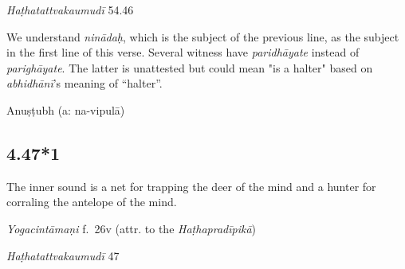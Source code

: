 \begin{ekdosis}

\begin{testimonia}[hp04_047]
\emph{Haṭhatattvakaumudī} 54.46
\begin{versinnote}
\end{versinnote}
\end{testimonia}

\begin{philcomm}[hp04_047]
We understand \textit{ninādaḥ}, which is the subject of the previous line, as the subject in the first line of this verse. Several witness have \emph{paridhāyate} instead of \emph{parighāyate}. The latter is unattested but could mean "is a halter" based on \emph{abhidhānī}’s meaning of “halter”.
\end{philcomm}

\begin{metre}[hp04_047]
Anuṣṭubh (a: na-vipulā)
\end{metre}

\subsection*{4.47*1}
\begin{translation}[hp04_047_1]
The inner sound is a net for trapping the deer of the mind and a hunter for corraling the antelope of the mind.
\end{translation}


\begin{testimonia}[hp04_047_1]
\emph{Yogacintāmaṇi} f.~26v (attr. to the \emph{Haṭhapradīpikā})
\begin{versinnote}
\end{versinnote}

\emph{Haṭhatattvakaumudī} 47
\begin{versinnote}
\end{versinnote}
\end{testimonia}


\end{ekdosis}

